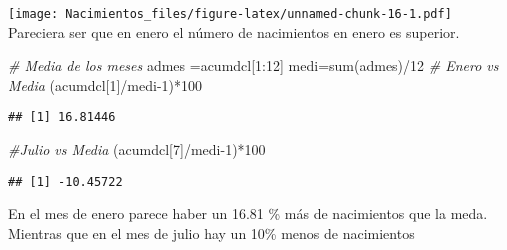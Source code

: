 \documentclass[
]{article}
\newenvironment{Shaded}{\begin{snugshade}}{\end{snugshade}}
\newcommand{\AttributeTok}[1]{\textcolor[rgb]{0.77,0.63,0.00}{#1}}
\newcommand{\CommentTok}[1]{\textcolor[rgb]{0.56,0.35,0.01}{\textit{#1}}}
\newcommand{\ControlFlowTok}[1]{\textcolor[rgb]{0.13,0.29,0.53}{\textbf{#1}}}
\newcommand{\DecValTok}[1]{\textcolor[rgb]{0.00,0.00,0.81}{#1}}
\newcommand{\FunctionTok}[1]{\textcolor[rgb]{0.00,0.00,0.00}{#1}}
\newcommand{\NormalTok}[1]{#1}
\newcommand{\OtherTok}[1]{\textcolor[rgb]{0.56,0.35,0.01}{#1}}
\newcommand{\SpecialCharTok}[1]{\textcolor[rgb]{0.00,0.00,0.00}{#1}}
\newcommand{\StringTok}[1]{\textcolor[rgb]{0.31,0.60,0.02}{#1}}
\begin{document}
\begin{Shaded}
\end{Shaded}

\texttt{[image: Nacimientos\_files/figure-latex/unnamed-chunk-16-1.pdf]}
Pareciera ser que en enero el número de nacimientos en enero es
superior.

\begin{Shaded}
\begin{Highlighting}[]
\CommentTok{\# Media de los meses}
\NormalTok{admes }\OtherTok{=}\NormalTok{acumdcl[}\DecValTok{1}\SpecialCharTok{:}\DecValTok{12}\NormalTok{]}
\NormalTok{medi}\OtherTok{=}\FunctionTok{sum}\NormalTok{(admes)}\SpecialCharTok{/}\DecValTok{12}
\CommentTok{\# Enero vs Media}
\NormalTok{(acumdcl[}\DecValTok{1}\NormalTok{]}\SpecialCharTok{/}\NormalTok{medi}\DecValTok{{-}1}\NormalTok{)}\SpecialCharTok{*}\DecValTok{100} 
\end{Highlighting}
\end{Shaded}

\begin{verbatim}
## [1] 16.81446
\end{verbatim}

\begin{Shaded}
\begin{Highlighting}[]
\CommentTok{\#Julio vs Media}
\NormalTok{(acumdcl[}\DecValTok{7}\NormalTok{]}\SpecialCharTok{/}\NormalTok{medi}\DecValTok{{-}1}\NormalTok{)}\SpecialCharTok{*}\DecValTok{100} 
\end{Highlighting}
\end{Shaded}

\begin{verbatim}
## [1] -10.45722
\end{verbatim}

En el mes de enero parece haber un 16.81 \% más de nacimientos que la
meda. Mientras que en el mes de julio hay un 10\% menos de nacimientos
\end{document}
